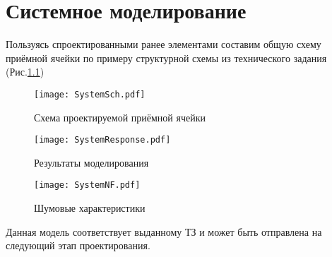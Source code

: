 \chapter{Системное моделирование} \label{chap:system_modeling}

Пользуясь спроектированными ранее элементами составим общую схему приёмной
ячейки по примеру структурной схемы из технического задания (Рис.\ref{fig:SystemSch})

\begin{figure}[H]
	\centering
	\texttt{[image: SystemSch.pdf]}
	\caption{Схема проектируемой приёмной ячейки}%
	\label{fig:SystemSch}
\end{figure}

\begin{figure}[H]
	\centering
	\texttt{[image: SystemResponse.pdf]}
	\caption{Результаты моделирования}%
	\label{fig:SystemResponse}
\end{figure}

\begin{figure}[H]
	\centering
	\texttt{[image: SystemNF.pdf]}
	\caption{Шумовые характеристики}%
	\label{fig:SystemNF}
\end{figure}

Данная модель соответствует выданному ТЗ и может быть отправлена на следующий 
этап проектирования.